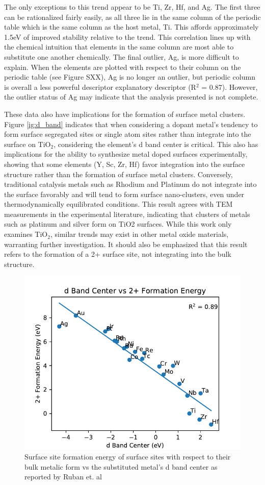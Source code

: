 \documentclass[catalysts,article,submit,moreauthors,pdftex,10pt,a4paper]{mdpi}
\theoremstyle{mdpi}
\newcounter{ex}
\newcounter{re}
\theoremstyle{mdpidefinition}
\begin{document}
The only exceptions to this trend appear to be Ti, Zr, Hf, and Ag. The first three can be rationalized fairly easily, as all three lie in the same column of the periodic table which is the same column as the host metal, Ti. This affords approximately 1.5eV of improved stability relative to the trend. This correlation lines up with the chemical intuition that elements in the same column are most able to substitute one another chemically. The final outlier, Ag, is more difficult to explain. When the elements are plotted with respect to their column on the periodic table (see Figure SXX), Ag is no longer an outlier, but periodic column is overall a less powerful descriptor explanatory descriptor (R$^2$ = 0.87). However, the outlier status of Ag may indicate that the analysis presented is not complete.

These data also have implications for the formation of surface metal clusters. Figure \ref{ig:d_band} indicates that when considering a dopant metal's tendency to form surface segregated sites or single atom sites rather than integrate into the surface on TiO$_2$, considering the element's d band center is critical. This also has implications for the ability to synthesize metal doped surfaces experimentally, showing that some elements (Y, Sc, Zr, Hf) favor integration into the surface structure rather than the formation of surface metal clusters. Conversely, traditional catalysis metals such as Rhodium and Platinum do not integrate into the surface favorably and will tend to form surface nano-clusters, even under thermodynamically equilibrated conditions. This result agrees with TEM measurements in the experimental literature, indicating that clusters of metals such as platinum and silver form on TiO2 surfaces.\cite{Iliev_2006}  While this work only examines TiO$_2$, similar trends may exist in other metal oxide materials, warranting further investigation. It should also be emphasized that this result refers to the formation of a 2+ surface site, not integrating into the bulk structure.

\begin{figure}
    \centering
    \includegraphics[width=0.8\linewidth]{Images/d_band_vs_formation.pdf}
    \caption{Surface site formation energy of surface sites with respect to their bulk metalic form vs the substituted metal's d band center as reported by Ruban et. al \cite{Ruban_1997}}
    \label{fig:d_band}
\end{figure}
\end{document}
